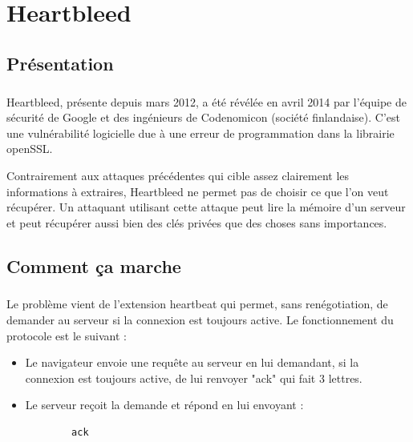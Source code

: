 \chapter{Heartbleed}
\label{chapter:Heartbleed}

\section{Présentation}
\paragraph{}
Heartbleed, présente depuis mars 2012, a été révélée en avril 2014 par l'équipe de sécurité de Google et des ingénieurs de Codenomicon (société finlandaise). C'est une vulnérabilité logicielle due à une erreur de programmation dans la librairie openSSL.

Contrairement aux attaques précédentes qui cible assez clairement les informations à extraires, Heartbleed ne permet pas de choisir ce que l'on veut récupérer. Un attaquant utilisant cette attaque peut lire la mémoire d'un serveur et peut récupérer aussi bien des clés privées que des choses sans importances.

\section{Comment ça marche}
\paragraph{}
Le problème vient de l'extension heartbeat qui permet, sans renégotiation, de demander au serveur si la connexion est toujours active. Le fonctionnement du protocole est le suivant :
\begin{itemize}
  \item Le navigateur envoie une requête au serveur en lui demandant, si la connexion est toujours active, de lui renvoyer "ack" qui fait 3 lettres.
  \item Le serveur reçoit la demande et répond en lui envoyant :
  	\begin{verbatim}
		ack
	\end{verbatim}
\end{itemize}

